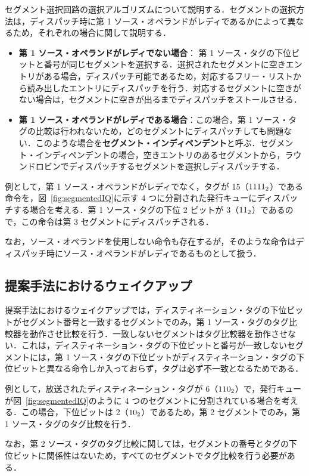 \documentclass[submit,techrep,noauthor]{ipsj}
\newcommand{\fig}[1]{{図~\ref{fig:#1}}}
\begin{document}
セグメント選択回路の選択アルゴリズムについて説明する．セグメントの選択方法は，ディスパッチ時に第 1 ソース・オペランドがレディであるかによって異なるため，それぞれの場合に関して説明する．
\begin{itemize}
  \item \textbf{第 1 ソース・オペランドがレディでない場合}： 第 1 ソース・タグの下位ビットと番号が同じセグメントを選択する．選択されたセグメントに空きエントリがある場合，ディスパッチ可能であるため，対応するフリー・リストから読み出したエントリにディスパッチを行う．対応するセグメントに空きがない場合は，セグメントに空きが出るまでディスパッチをストールさせる．
  \item \textbf{第 1 ソース・オペランドがレディである場合}：この場合，第 1 ソース・タグの比較は行われないため，どのセグメントにディスパッチしても問題ない．このような場合を\textbf{セグメント・インディペンデント}と呼ぶ．セグメント・インディペンデントの場合，空きエントリのあるセグメントから，ラウンドロビンでディスパッチするセグメントを選択しディスパッチする．
\end{itemize}
例として，第 1 ソース・オペランドがレディでなく，タグが 15（${\rm 1111_2}$）である命令を，\fig{segmentedIQ}に示す 4 つに分割された発行キューにディスパッチする場合を考える．第 1 ソース・タグの下位 2 ビットが 3（${\rm 11_2}$）であるので，この命令は第 3 セグメントにディスパッチされる．　

なお，ソース・オペランドを使用しない命令も存在するが，そのような命令はディスパッチ時にソース・オペランドがレディであるものとして扱う．


\subsection{提案手法におけるウェイクアップ}
提案手法におけるウェイクアップでは，ディスティネーション・タグの下位ビットがセグメント番号と一致するセグメントでのみ，第 1 ソース・タグのタグ比較器を動作させ比較を行う．一致しないセグメントはタグ比較器を動作させない．これは，ディスティネーション・タグの下位ビットと番号が一致しないセグメントには，第 1 ソース・タグの下位ビットがディスティネーション・タグの下位ビットと異なる命令しか入っておらず，タグは必ず不一致となるためである．

例として，放送されたディスティネーション・タグが 6（${\rm 110_2}$）で，発行キューが\fig{segmentedIQ}のように 4 つのセグメントに分割されている場合を考える．この場合，下位ビットは 2（${\rm 10_2}$）であるため，第 2 セグメントでのみ，第 1 ソース・タグのタグ比較を行う．

なお，第 2 ソース・タグのタグ比較に関しては，セグメントの番号とタグの下位ビットに関係性はないため，すべてのセグメントでタグ比較を行う必要がある．
\end{document}
